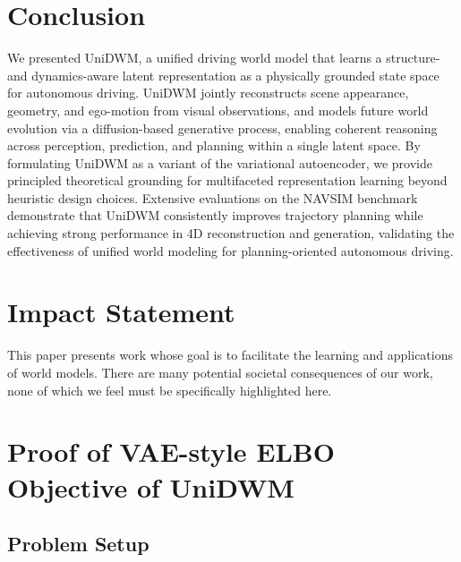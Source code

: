 \documentclass{article}
\theoremstyle{plain}
\theoremstyle{definition}
\theoremstyle{remark}
\begin{document}
\section{Conclusion}
We presented UniDWM, a unified driving world model that learns a structure- and dynamics-aware latent representation as a physically grounded state space for autonomous driving. UniDWM jointly reconstructs scene appearance, geometry, and ego-motion from visual observations, and models future world evolution via a diffusion-based generative process, enabling coherent reasoning across perception, prediction, and planning within a single latent space. By formulating UniDWM as a variant of the variational autoencoder, we provide principled theoretical grounding for multifaceted representation learning beyond heuristic design choices. Extensive evaluations on the NAVSIM benchmark demonstrate that UniDWM consistently improves trajectory planning while achieving strong performance in 4D reconstruction and generation, validating the effectiveness of unified world modeling for planning-oriented autonomous driving.

\section*{Impact Statement}
This paper presents work whose goal is to facilitate the learning and applications of world models. There are many potential societal consequences of our work, none of which we feel must be specifically highlighted here.





\newpage
\appendix
\onecolumn

\section{Proof of VAE-style ELBO Objective of UniDWM}
\label{vae_unidwm}
\subsection{Problem Setup}
\end{document}
